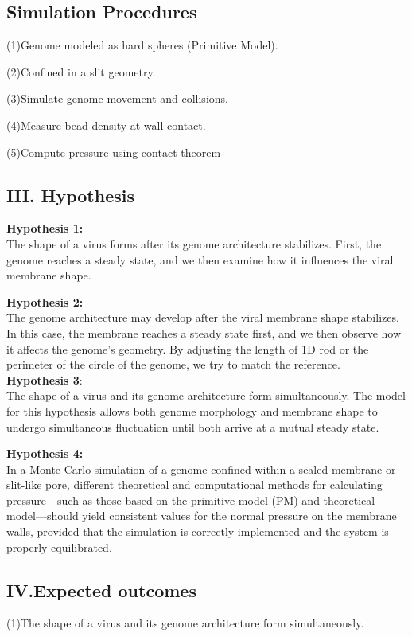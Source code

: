 \documentclass[12pt]{article}
\begin{document}
\begin{flushleft}
\subsection*{Simulation Procedures}

(1)Genome modeled as hard spheres (Primitive Model).

(2)Confined in a slit geometry.

(3)Simulate genome movement and collisions.

(4)Measure bead density at wall contact.

(5)Compute pressure using contact theorem
\subsection*{III. Hypothesis}
\noindent \textbf{Hypothesis 1:}\\
The shape of a virus forms after its genome architecture stabilizes. First, the genome reaches a steady state, and we then examine how it influences the viral membrane shape. 

\noindent \textbf{Hypothesis 2:}\\
The genome architecture may develop after the viral membrane shape stabilizes. In this case, the membrane reaches a steady state first, and we then observe how it affects the genome’s geometry. By adjusting the length of 1D rod or the perimeter of the circle of the genome, we try to match the reference.\cite{goldsmith2003monkeypox}\\

\noindent \textbf{Hypothesis 3}:\\
The shape of a virus and its genome architecture form simultaneously.
The model for this hypothesis allows both genome morphology and membrane shape to undergo simultaneous
fluctuation until both arrive at a mutual steady state.

	
\noindent \textbf{Hypothesis 4:}\\
In a Monte Carlo simulation of a genome confined within a sealed membrane or slit-like pore, different theoretical and computational methods for calculating pressure—such as those based on the primitive model (PM) and theoretical model—should yield consistent values for the normal pressure on the membrane walls, provided that the simulation is correctly implemented and the system is properly equilibrated.




\subsection*{IV.Expected outcomes} 
(1)The shape of a virus and its genome architecture form simultaneously.
	

\end{flushleft}
\end{document}
